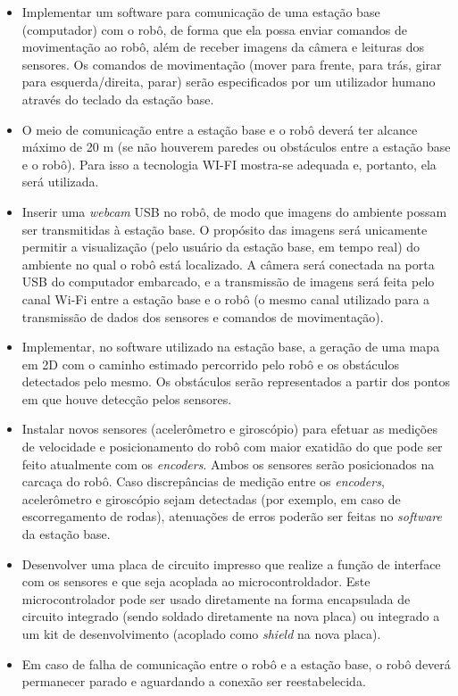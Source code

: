 \begin{itemize}
  \item Implementar um software para comunicação de uma estação base (computador) com o robô, de forma que ela possa enviar comandos de movimentação ao robô, além de receber imagens da câmera e leituras dos sensores. Os comandos de movimentação (mover para frente, para trás, girar para esquerda/direita, parar) serão especificados por um utilizador humano através do teclado da estação base. 
  \item O meio de comunicação entre a estação base e o robô deverá ter alcance máximo de 20 m (se não houverem paredes ou obstáculos entre a estação base e o robô). Para isso a tecnologia WI-FI mostra-se adequada e, portanto, ela será utilizada.
  \item Inserir uma \textit{webcam} USB no robô, de modo que imagens do ambiente possam ser transmitidas à estação base. O propósito das imagens será unicamente permitir a visualização (pelo usuário da estação base, em tempo real) do ambiente no qual o robô está localizado. A câmera será conectada na porta USB do computador embarcado, e a transmissão de imagens será feita pelo canal Wi-Fi entre a estação base e o robô (o mesmo canal utilizado para a transmissão de dados dos sensores e comandos de movimentação).
  \item Implementar, no software utilizado na estação base, a geração de uma mapa em 2D com o caminho estimado percorrido pelo robô e os obstáculos detectados pelo mesmo. Os obstáculos serão representados a partir dos pontos em que houve detecção pelos sensores.
  \item Instalar novos sensores (acelerômetro e giroscópio) para efetuar as medições de velocidade e posicionamento do robô com maior exatidão do que pode ser feito atualmente com os \textit{encoders}. Ambos os sensores serão posicionados na carcaça do robô. Caso discrepâncias de medição entre os \textit{encoders}, acelerômetro e giroscópio sejam detectadas (por exemplo, em caso de escorregamento de rodas), atenuações de erros poderão ser feitas no \textit{software} da estação base.
  \item Desenvolver uma placa de circuito impresso que realize a função de interface com os sensores e que seja acoplada ao microcontroldador. Este microcontrolador pode ser usado diretamente na forma encapsulada de circuito integrado (sendo soldado diretamente na nova placa) ou integrado a um kit de desenvolvimento (acoplado como \textit{shield} na nova placa).
  \item Em caso de falha de comunicação entre o robô e a estação base, o robô deverá permanecer parado e aguardando a conexão ser reestabelecida.
\end{itemize}